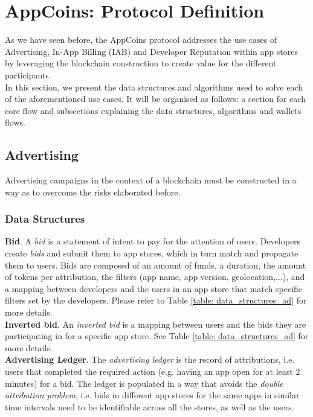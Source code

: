 \section{AppCoins: Protocol Definition}
\label{sec:protocol}

As we have seen before, the AppCoins protocol addresses the use cases of Advertising, In-App Billing (IAB) and Developer Reputation within app stores by leveraging the blockchain construction to create value for the different participants.\\

In this section, we present the data structures and algorithms used to solve each of the aforementioned use cases. It will be organised as follows: a section for each core flow and subsections explaining the data structures, algorithms and wallets flows.

\subsection{Advertising}

Advertising campaigns in the context of a blockchain must be constructed in a way as to overcome the risks elaborated before.

\subsubsection{Data Structures}
\label{sssec:ads_ds}

\noindent \textbf{Bid}. A \textit{bid} is a statement of intent to pay for the attention of users. Developers create \textit{bids} and submit them to app stores, which in turn match and propagate them to users. Bids are composed of an amount of funds, a duration, the amount of tokens per attribution, the filters (app name, app version, geolocation,...), and a mapping between developers and the users in an app store that match specific filters set by the developers. Please refer to Table \ref{table: data_structures_ad} for more details. \\

\noindent \textbf{Inverted bid}. An \textit{inverted bid} is a mapping between users and the bids they are participating in for a specific app store. See Table \ref{table: data_structures_ad} for more details.\\

\noindent \textbf{Advertising Ledger}. The \textit{advertising ledger} is the record of attributions, i.e. users that completed the required action (e.g. having an app open for at least 2 minutes) for a bid. The ledger is populated in a way that avoids the \textit{double attribution problem}, i.e. bids in different app stores for the same apps in similar time intervals need to be identifiable across all the stores, as well as the users.


